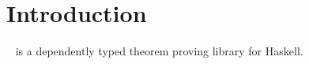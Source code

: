 \section{Introduction}

\Ivor{}~\cite{ivor} is a dependently typed theorem proving library for
Haskell.

